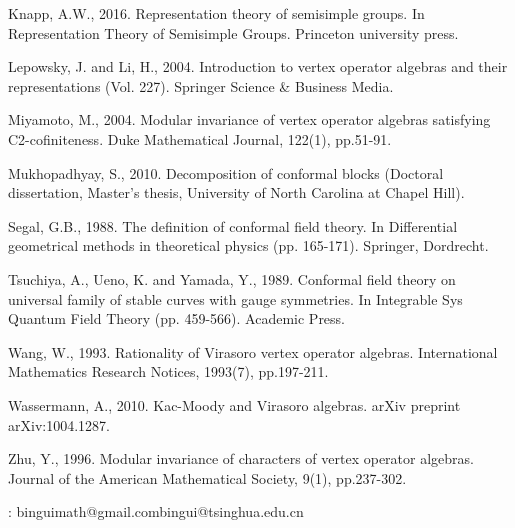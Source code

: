 \documentclass[11pt,b5paper,notitlepage]{article}
\theoremstyle{definition}
\theoremstyle{plain}
\numberwithin{equation}{section}
\begin{document}
\begin{thebibliography}{999999}
Knapp, A.W., 2016. Representation theory of semisimple groups. In Representation Theory of Semisimple Groups. Princeton university press.



Lepowsky, J. and Li, H., 2004. Introduction to vertex operator algebras and their representations (Vol. 227). Springer Science \& Business Media.

Miyamoto, M., 2004. Modular invariance of vertex operator algebras satisfying C2-cofiniteness. Duke Mathematical Journal, 122(1), pp.51-91.


Mukhopadhyay, S., 2010. Decomposition of conformal blocks (Doctoral dissertation, Master’s thesis, University of North Carolina at Chapel Hill).

Segal, G.B., 1988. The definition of conformal field theory. In Differential geometrical methods in theoretical physics (pp. 165-171). Springer, Dordrecht.

Tsuchiya, A., Ueno, K. and Yamada, Y., 1989. Conformal field theory on universal family of stable curves with gauge symmetries. In Integrable Sys Quantum Field Theory (pp. 459-566). Academic Press.





Wang, W., 1993. Rationality of Virasoro vertex operator algebras. International Mathematics Research Notices, 1993(7), pp.197-211.



Wassermann, A., 2010. Kac-Moody and Virasoro algebras. arXiv preprint arXiv:1004.1287.

Zhu, Y., 1996. Modular invariance of characters of vertex operator algebras. Journal of the American Mathematical Society, 9(1), pp.237-302.




		
		
\end{thebibliography}


: binguimath@gmail.com\qquad bingui@tsinghua.edu.cn
\end{document}
